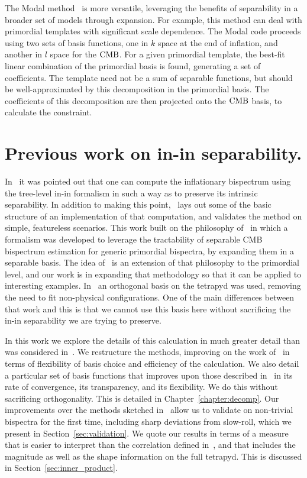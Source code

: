     The Modal method~\cite{FergShell_2014} is more versatile, 
    leveraging the benefits of separability in a broader set of models through expansion.
    For example, this method can deal with primordial templates with significant scale dependence.
    The Modal code proceeds using two sets of basis functions, one in $k$ space at the end
    of inflation, and another in $l$ space for the $\text{CMB}$.
    For a given primordial template, the best-fit linear combination of the primordial basis
    is found, generating a set of coefficients.
    The template need not be a sum of separable functions, but should be well-approximated by this
    decomposition in the primordial basis.
    The coefficients of this decomposition are then projected onto the $\text{CMB}$ basis, to calculate the constraint.


\section{Previous work on in-in separability.}
    In~\cite{Funakoshi} it was pointed out that one can compute the inflationary
    bispectrum using the
tree-level in-in formalism in such a way as to preserve its intrinsic
separability. In addition to making this point,~\cite{Funakoshi} lays
out some of the basic structure of an implementation of that computation,
and validates the method on simple, featureless scenarios.
This work built on the philosophy of~\cite{FergShell_1,FergShell_2,FergShell_3}
in which a formalism was developed to
leverage the tractability of separable CMB bispectrum estimation
for generic primordial bispectra, by expanding them in a separable basis.
The idea of~\cite{Funakoshi} is an extension of that philosophy to the primordial level,
and our work is in expanding that methodology so that it can be applied
to interesting examples.
In~\cite{FergShell_1,FergShell_2,FergShell_3} an orthogonal basis on the tetrapyd was used,
removing the need to fit non-physical configurations.
One of the main differences between that work and this
is that we cannot use this basis here without sacrificing the
in-in separability we are trying to preserve.

In this work we explore the details of this calculation in much greater detail
than was considered in~\cite{Funakoshi}.
We restructure the methods, improving on the work of~\cite{Funakoshi} in terms
of flexibility of basis choice and efficiency of the calculation.
We also detail a particular set of basis functions that improves upon those described
in~\cite{Funakoshi} in its rate of convergence, its transparency,
and its flexibility.
We do this without sacrificing orthogonality.
This is detailed in Chapter~\ref{chapter:decomp}.
Our improvements over the methods sketched in~\cite{Funakoshi} allow us to validate
on non-trivial bispectra for the first time, including sharp deviations from slow-roll, which we present in
Section~\ref{sec:validation}.
We quote our results in terms of a measure that is
easier to interpret than the correlation defined in~\cite{Funakoshi},
and that includes the magnitude as well as the shape information
on the full tetrapyd.
This is discussed in Section~\ref{sec:inner_product}.


